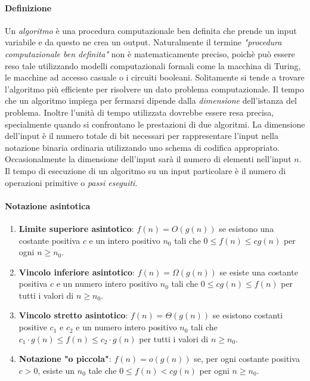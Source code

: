 \documentclass{article}
\theoremstyle{definition}
\begin{document}
\paragraph{Definizione}
Un \textit{algoritmo} è una procedura computazionale ben definita che prende un input variabile e da questo ne crea un output. Naturalmente il termine \textit{"procedura computazionale ben definita"} non è matematicamente preciso, poichè può essere reso tale utilizzando modelli computazionali formali come la macchina di Turing, le macchine ad accesso casuale o i circuiti booleani. 
Solitamente si tende a trovare l'algoritmo più efficiente per risolvere un dato problema computazionale. Il tempo che un algoritmo impiega per fermarsi dipende dalla \textit{dimensione} dell'istanza del problema. Inoltre l'unità di tempo utilizzata dovrebbe essere resa precisa, specialmente quando si confrontano le prestazioni di due algoritmi. La dimensione dell'input è il numero totale di bit necessari per rappresentare l'input nella notazione binaria ordinaria utilizzando uno schema di codifica appropriato. Occasionalmente la dimensione dell'input sarà il numero di elementi nell'input $n$. Il tempo di esecuzione di un algoritmo su un input particolare è il numero di operazioni primitive o \textit{passi eseguiti}.

\paragraph{Notazione asintotica}
\begin{enumerate}
\item \textbf{Limite superiore asintotico}: \( f(n) = O(g(n)) \) se esistono una costante positiva \( c \) e un intero positivo \( n_0 \) tali che \( 0 \leq f(n) \leq cg(n) \) per ogni \( n \geq n_0 \).


\item \textbf{Vincolo inferiore asintotico}: \( f(n) = \Omega(g(n)) \) se esiste una costante positiva \( c \) e un numero intero positivo \( n_0 \) tali che \( 0 \leq c  g(n) \leq f(n) \) per tutti i valori di \( n \geq n_0 \).

\item \textbf{Vincolo stretto asintotico}: \( f(n) = \Theta(g(n)) \) se esistono costanti positive \( c_1 \) e \( c_2 \) e un numero intero positivo \( n_0 \) tali che \( c_1 \cdot g(n) \leq f(n) \leq c_2 \cdot g(n) \) per tutti i valori di \( n \geq n_0 \).

\item \textbf{Notazione "o piccola"}: \( f(n) = o(g(n)) \) se, per ogni costante positiva \( c > 0 \), esiste un \( n_0 \) tale che \( 0 \leq f(n) < c  g(n) \) per ogni \( n \geq n_0 \).

\end{enumerate}
\end{document}
